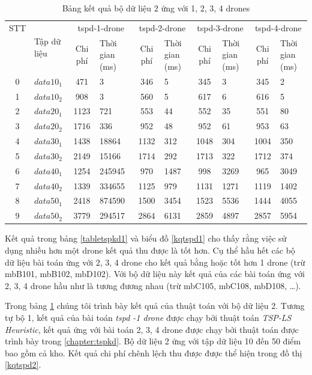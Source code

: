 \documentclass[a4paper,12pt]{report}
\begin{document}
\footnotesize
\begin{longtable}{|c|l|c|p{1.5cm}|c|p{1cm}|c|p{1cm}|c|p{1cm}|}
\caption{Bảng kết quả bộ dữ liệu 2 ứng với 1, 2, 3, 4 drones}
\label{tabletspkd2}\\ 
\toprule
STT&\multirow{2}{*}{Tập dữ liệu} & \multicolumn{2}{c|}{tspd-1-drone } &\multicolumn{2}{c|}{tspd-2-drone } &\multicolumn{2}{c|}{tspd-3-drone }&\multicolumn{2}{c|}{tspd-4-drone } \\
\cline{3-10} 
&&Chi phí &Thời gian (ms)&Chi phí &Thời gian (ms)&Chi phí &Thời gian (ms)&Chi phí &Thời gian (ms)\\
\midrule
\toprule
0&$data 10_1$&471& 3
&346& 5
&345& 3
&345& 2\\
\hline
1&$data 10_2$&908& 3
&560& 5
&617& 6
&616& 5 \\
\hline
2&$data 20_1$&1123& 721
&553& 44
&552& 35
&551& 80\\
\hline
3&$data 20_2$&1716&  336
&952& 48
&952& 61
&953& 63 \\
\hline
4&$data 30_1$&1438& 18864
&1132& 312
&1048& 304
&1004& 350 \\
\hline
5&$data 30_2$&2149& 15166
&1714& 292
&1713& 322
&1712& 374 \\
\hline

6&$data 40_1$&1254& 245945
&970& 1487
&998&  3269
&965& 3049 \\
\hline
7&$data 40_2$&1339& 334655
&1125& 979
&1131& 1271
&1119 &1402 \\
\hline

8&$data 50_1$&2418& 874590
&1500& 3454
&1523& 5536
&1444& 4055 \\
\hline

9&$data 50_2$ & 3779 & 294517
& 2864 &6131
&2859 &4897
&2857 &5954 \\
\hline





\end{longtable}
\normalsize
Kết quả trong bảng \ref{tabletspkd1} và biểu đồ \ref{kqtspd1} cho thấy rằng việc sử dụng nhiều hơn một drone kết quả thu được là tốt hơn. Cụ thể hầu hết các bộ dữ liệu bài toán ứng với 2, 3, 4 drone cho kết quả bằng hoặc tốt hơn 1 drone (trừ mbB101, mbB102, mbD102). Với bộ dữ liệu này kết quả của các bài toán ứng với 2, 3, 4 drone hầu như là tương đương nhau (trừ mbC105, mbC108, mbD108, \dots).

Trong bảng \ref{tabletspkd2} chúng tôi trình bày kết quả của thuật toán với bộ dữ liệu 2. Tương tự bộ 1, kết quả của bài toán \textit{tspd -1 drone} được chạy bởi thuật toán \textit{TSP-LS Heuristic}, kết quả ứng với bài toán 2, 3, 4 drone được chạy bởi thuật toán được trình bày trong \ref{chapter:tspkd}. Bộ dữ liệu 2 ứng với tập dữ liệu 10 đến 50 điểm bao gồm cả kho. Kết quả chi phí chênh lệch thu được được thể hiện trong đồ thị \ref{kqtspd2}.\\
\end{document}
